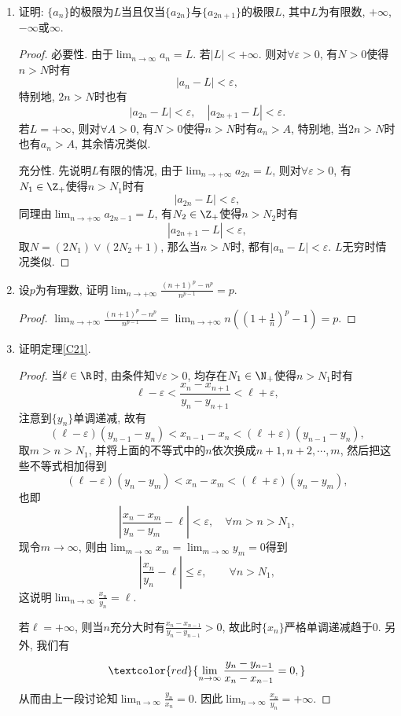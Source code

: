 \begin{2a}
\begin{enumerate}
\item 证明: \(\{a_n\}\)的极限为\(L\)当且仅当\(\{a_{2n}\}\)与\(\{a_{2n+1}\}\)的极限\(L\), 
其中\(L\)为有限数, \(+\infty\), \(-\infty\)或\(\infty\).
\begin{proof}
必要性. 由于\(\lim_{n\rightarrow\infty}a_n=L\). 若\(|L|<+\infty\). 
则对\(\forall\varepsilon>0\), 有\(N>0\)使得\(n>N\)时有\[|a_n-L|<\varepsilon,\]
特别地, \(2n>N\)时也有\[|a_{2n}-L|<\varepsilon,\quad|a_{2n+1}-L|<\varepsilon.\]
若\(L=+\infty\), 则对\(\forall A>0\), 有\(N>0\)使得\(n>N\)时有\(a_n>A\), 
特别地, 当\(2n>N\)时也有\(a_n>A\), 其余情况类似. 

充分性. 先说明\(L\)有限的情况, 由于\(\lim_{n\rightarrow+\infty}a_{2n}=L\), 
则对\(\forall\varepsilon>0\), 有\(N_1\in\Z_+\)使得\(n>N_1\)时有
\[|a_{2n}-L|<\varepsilon,\]同理由\(\lim_{n\rightarrow+\infty}a_{2n-1}=L\), 
有\(N_2\in\Z_+\)使得\(n>N_2\)时有\[|a_{2n+1}-L|<\varepsilon,\]
取\(N=(2N_1)\vee(2N_2+1)\), 那么当\(n>N\)时, 都有\(|a_n-L|<\varepsilon\). 
\(L\)无穷时情况类似.
\end{proof}
\item 设\(p\)为有理数, 证明\(\lim_{n\rightarrow+\infty}\frac{(n+1)^p-n^p}{n^{p-1}}=p\).
\begin{proof}
\(\lim_{n\rightarrow+\infty}\frac{(n+1)^p-n^p}{n^{p-1}}
=\lim_{n\rightarrow+\infty}n\left(\left(1+\frac{1}{n}\right)^p-1\right)=p.\)\qedhere
\end{proof}
\item 证明定理\ref{C21}.
\begin{proof}
当\(\ell\in\R\)时, 由条件知\(\forall\varepsilon>0\), 
均存在\(N_1\in\N_+\)使得\(n>N_1\)时有
\[\ell-\varepsilon<\frac{x_{n}-x_{n+1}}{y_n-y_{n+1}}<\ell+\varepsilon,\]
注意到\(\{y_n\}\)单调递减, 故有
\[(\ell-\varepsilon)(y_{n-1}-y_n)<x_{n-1}-x_{n}<(\ell+\varepsilon)(y_{n-1}-y_n),\]
取\(m>n>N_1\), 并将上面的不等式中的\(n\)依次换成\(n+1,n+2,\cdots,m\), 然后把这些不等式相加得到
\[(\ell-\varepsilon)(y_n-y_m)<x_n-x_m<(\ell+\varepsilon)(y_n-y_m),\]
也即\[\left|\frac{x_n-x_m}{y_n-y_m}-\ell\right|<\varepsilon,\quad\forall m>n>N_1,\]
现令\(m\rightarrow\infty\), 则由\(\lim_{m\rightarrow\infty}x_m=\lim_{m\rightarrow\infty}y_m=0\)得到
\[\left|\frac{x_n}{y_n}-\ell\right|\leqslant \varepsilon,\qquad\forall n>N_1,\]
这说明\(\lim_{n\rightarrow\infty}\frac{x_n}{y_n}=\ell.\)

若\(\ell=+\infty\), 则当\(n\)充分大时有\(\frac{x_{n}-x_{n-1}}{y_{n}-y_{n-1}}>0\), 
故此时\(\{x_n\}\)严格单调递减趋于$0$. 另外, 我们有
\[\textcolor{red}{\lim_{n\rightarrow\infty}\frac{y_n-y_{n-1}}{x_{n}-x_{n-1}}=0,}\]
从而由上一段讨论知\(\lim_{n\rightarrow\infty}\frac{y_n}{x_n}=0.\) 
因此\(\lim_{n\rightarrow\infty}\frac{x_n}{y_n}=+\infty.\)


\end{proof}
\end{enumerate}
\end{2a}
